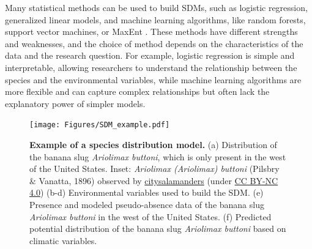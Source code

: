 Many statistical methods can be used to build SDMs, such as logistic
regression, generalized linear models, and machine learning algorithms, like
random forests, support vector machines, or MaxEnt \cite{Franklin2010}. These
methods have different strengths and weaknesses, and the choice of method
depends on the characteristics of the data and the research question. For
example, logistic regression is simple and interpretable, allowing researchers
to understand the relationship between the species and the environmental
variables, while machine learning algorithms are more flexible and can
capture complex relationships but often lack the explanatory power of simpler
models.

\begin{figure}
  \centering
  \texttt{[image: Figures/SDM\_example.pdf]}
  \caption[Example of a species distribution model]{
    \textbf{Example of a species distribution model.} (a) Distribution of
    the banana slug \textit{Ariolimax buttoni}, which is only present in the
    west of the United States. Inset:  \textit{Ariolimax (Ariolimax) buttoni}
    (Pilsbry \& Vanatta, 1896) observed by
    \href{https://www.inaturalist.org/photos/345291902}{citysalamanders}
    (under
    \href{http://creativecommons.org/licenses/by-nc/4.0/}{CC BY-NC 4.0})
    (b-d)
    Environmental variables used to build the SDM. (e) Presence and modeled
    pseudo-absence data of the banana slug \textit{Ariolimax buttoni} in the
    west of the United States. (f) Predicted potential distribution of the
    banana slug \textit{Ariolimax buttoni} based on climatic variables.}
  \label{fig:SDM_example}
\end{figure}


